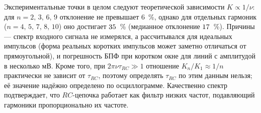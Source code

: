 \documentclass[a4paper,12pt]{article}
\begin{document}
Экспериментальные точки в целом следуют теоретической зависимости
$K\propto1/\nu$: для $n = 2,\,3,\,6,\,9$ отклонение не превышает
$6$~\%, однако для отдельных гармоник ($n = 4,\,5,\,7,\,8,\,10$) оно
достигает $35$~\% (медианное отклонение $17$~\%).
Причины --- спектр входного сигнала не измерялся, а рассчитывался для
идеальных импульсов (форма реальных коротких импульсов может заметно отличаться от
прямоугольной), и погрешность БПФ при коротком окне для линий с амплитудой в
несколько мВ. Кроме того, при $2\pi\nu\tau_{RC}\gg1$ отношение
$K_n/K_1\approx1/n$ практически не зависит от $\tau_{RC}$, поэтому
определять $\tau_{RC}$ по этим данным нельзя; её значение надёжно
определено по осциллограмме. Качественно спектр подтверждает, что
$RC$-цепочка работает как фильтр низких частот, подавляющий гармоники
пропорционально их частоте.
\end{document}
